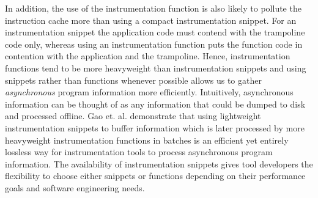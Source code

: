 In addition, the use of the instrumentation function is also likely to pollute
the instruction cache more than using a compact instrumentation snippet. For an
instrumentation snippet the application code must contend with the trampoline
code only, whereas using an instrumentation function puts the function code in
contention with the application and the trampoline. Hence, instrumentation
functions tend to be more heavyweight than instrumentation snippets and using
snippets rather than functions whenever possible allows us to gather
\textit{asynchronous} program information more efficiently. Intuitively,
asynchronous information can be thought of as any information that could be
dumped to disk and processed offline. Gao et. al. \cite{gao2005aliter}
demonstrate that using lightweight instrumentation snippets to buffer
information which is later processed by more heavyweight instrumentation
functions in batches is an efficient yet entirely lossless way for
instrumentation tools to process asynchronous program information. The
availability of instrumentation snippets gives tool developers the flexibility
to choose either snippets or functions depending on their performance goals and
software engineering needs.
